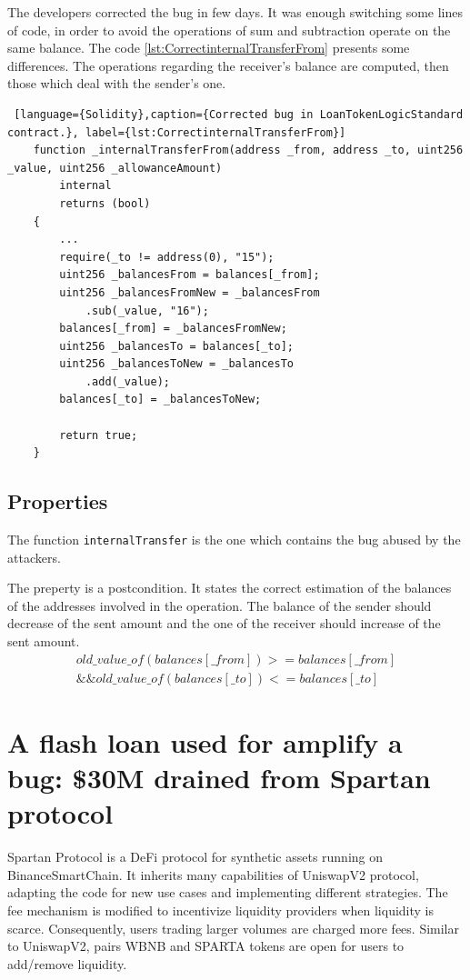 The developers corrected the bug in few days. 
It was enough switching some lines of code, in order to avoid the operations of sum and subtraction operate on the same balance. 
The code \autoref{lst:CorrectinternalTransferFrom} presents some differences. The operations regarding the receiver's balance are computed, then those which deal with the sender's one.
\begin{lstlisting} [language={Solidity},caption={Corrected bug in LoanTokenLogicStandard contract.}, label={lst:CorrectinternalTransferFrom}]
    function _internalTransferFrom(address _from, address _to, uint256 _value, uint256 _allowanceAmount)
        internal
        returns (bool)
    {
        ...
        require(_to != address(0), "15");
        uint256 _balancesFrom = balances[_from];
        uint256 _balancesFromNew = _balancesFrom
            .sub(_value, "16");
        balances[_from] = _balancesFromNew;
        uint256 _balancesTo = balances[_to];
        uint256 _balancesToNew = _balancesTo
            .add(_value);
        balances[_to] = _balancesToNew;
        
        return true;
    }   
\end{lstlisting}

\subsection{Properties}
The function \texttt{internalTransfer} is the one which contains the bug abused by the attackers. 

The preperty is a postcondition. 
It states the correct estimation of the balances of the addresses involved in the operation.
The balance of the sender should decrease of the sent amount and the one of the receiver should increase of the sent amount.
\begin{equation}
    \begin{split}
        old\_value\_of(balances[\_from])>=balances[\_from] \\
        \&\&old\_value\_of(balances[\_to])<=balances[\_to]
    \end{split}
\end{equation}


\section{A flash loan used for amplify a bug: \$30M  drained from Spartan protocol}   
\label{sec:Exploits:Spartan}
Spartan Protocol is a DeFi protocol for synthetic assets running on BinanceSmartChain. 
It inherits many capabilities of UniswapV2 protocol, adapting the code for new use cases and implementing different strategies. 
The fee mechanism is modified to incentivize liquidity providers when liquidity is scarce. Consequently, users trading larger 
volumes are charged more fees. Similar to UniswapV2, pairs WBNB and SPARTA tokens are open for users to add/remove liquidity. 

